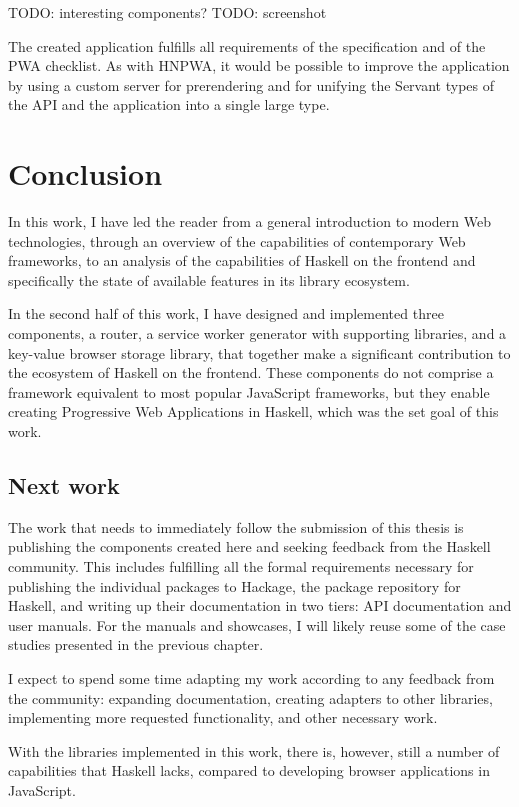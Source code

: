 \documentclass[english,odsaz]{fitthesis}
\begin{document}
TODO: interesting components?
TODO: screenshot

The created application fulfills all requirements of the specification and of
the PWA checklist. As with HNPWA, it would be possible to improve the
application by using a custom server for prerendering and for unifying the
Servant types of the API and the application into a single large type.

\chapter{Conclusion}
\label{sec:org2f93cd3}
In this work, I have led the reader from a general introduction to modern Web
technologies, through an overview of the capabilities of contemporary Web
frameworks, to an analysis of the capabilities of Haskell on the frontend and
specifically the state of available features in its library ecosystem.

In the second half of this work, I have designed and implemented three
components, a router, a service worker generator with supporting libraries, and
a key-value browser storage library, that together make a significant
contribution to the ecosystem of Haskell on the frontend. These components do not
comprise a framework equivalent to most popular JavaScript frameworks, but they
enable creating Progressive Web Applications in Haskell, which was the set goal
of this work.

\section{Next work}
\label{sec:org895e941}
The work that needs to immediately follow the submission of this thesis is
publishing the components created here and seeking feedback from the Haskell
community. This includes fulfilling all the formal requirements necessary for
publishing the individual packages to Hackage, the package repository for
Haskell, and writing up their documentation in two tiers: API documentation and
user manuals. For the manuals and showcases, I will likely reuse some of the
case studies presented in the previous chapter.

I expect to spend some time adapting my work according to any feedback from the
community: expanding documentation, creating adapters to other libraries,
implementing more requested functionality, and other necessary work.

With the libraries implemented in this work, there is, however, still a number of
capabilities that Haskell lacks, compared to developing browser applications in
JavaScript.
\end{document}
